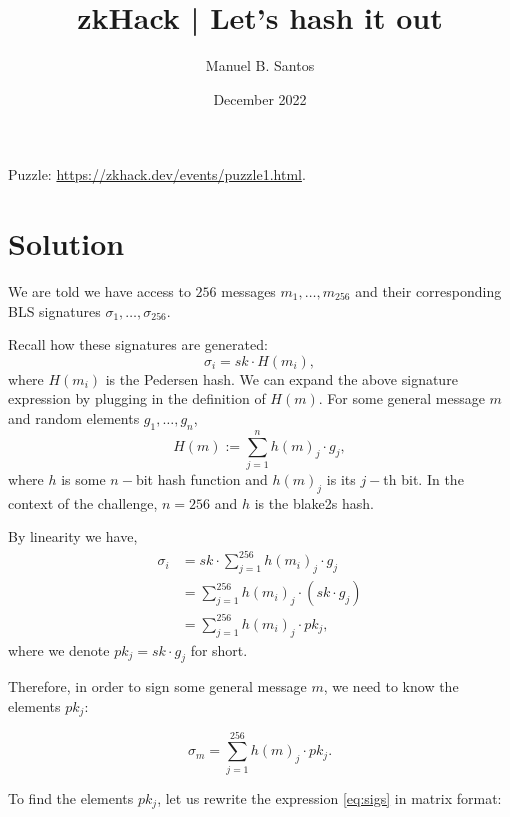 \documentclass{article}
\title{zkHack | Let's hash it out}
\author{Manuel B. Santos}
\date{December 2022}
\begin{document}
\maketitle

\noindent Puzzle: \url{https://zkhack.dev/events/puzzle1.html}.

\section{Solution}

We are told we have access to $256$ messages $m_1, \ldots, m_{256}$ and their corresponding BLS signatures $\sigma_1, \ldots, \sigma_{256}$.

Recall how these signatures are generated:
$$\sigma_i = sk \cdot H(m_i),$$
where $H(m_i)$ is the Pedersen hash. We can expand the above signature expression by plugging in the definition of $H(m)$. For some general message $m$ and random elements $g_1, \ldots, g_{n}$, 
$$H(m) := \sum_{j=1}^{n} h(m)_j \cdot g_j,$$
where $h$ is some $n-$bit  hash function and $h(m)_j$ is its $j-$th bit. In the context of the challenge, $n=256$ and $h$ is the blake2s hash.

By linearity we have, 
\begin{align}
\sigma_i &= sk \cdot \sum_{j=1}^{256} h(m_i)_j \cdot g_j \nonumber \\
&= \sum_{j=1}^{256} h(m_i)_j \cdot \left(sk \cdot g_j\right) \nonumber \\
&= \sum_{j=1}^{256} h(m_i)_j \cdot pk_j \label{eq:sigs},
\end{align}
where we denote $pk_j = sk\cdot g_j$ for short. 

Therefore, in order to sign some general message $m$, we need to know the elements $pk_j$:

\begin{equation}
\label{eq:main}
    \sigma_m = \sum_{j=1}^{256} h(m)_j \cdot pk_j.
\end{equation}

To find the elements $pk_j$, let us rewrite the expression \eqref{eq:sigs} in matrix format:
\end{document}
